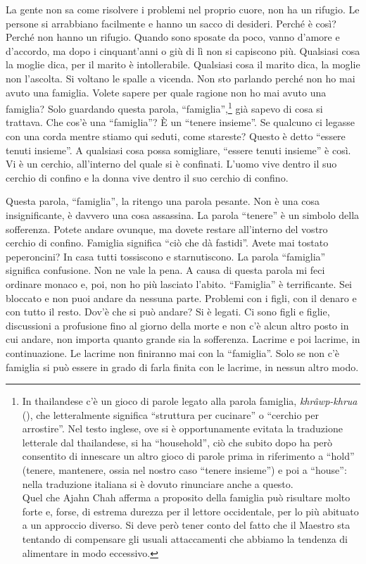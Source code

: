 La gente non sa come risolvere i problemi nel proprio cuore, non ha un
rifugio. Le persone si arrabbiano facilmente e hanno un sacco di
desideri. Perché è così? Perché non hanno un rifugio. Quando sono
sposate da poco, vanno d'amore e d'accordo, ma dopo i cinquant'anni o
giù di lì non si capiscono più. Qualsiasi cosa la moglie dica, per il
marito è intollerabile. Qualsiasi cosa il marito dica, la moglie non
l'ascolta. Si voltano le spalle a vicenda. Non sto parlando perché non
ho mai avuto una famiglia. Volete sapere per quale ragione non ho mai
avuto una famiglia? Solo guardando questa parola,
``famiglia'',\footnote{In thailandese c'è un gioco di parole legato alla
  parola famiglia, \emph{khrâwp-khrua} (), che letteralmente
  significa ``struttura per cucinare'' o ``cerchio per arrostire''. Nel
  testo inglese, ove si è opportunamente evitata la traduzione letterale
  dal thailandese, si ha ``household'', ciò che subito dopo ha però
  consentito di innescare un altro gioco di parole prima in riferimento
  a ``hold'' (tenere, mantenere, ossia nel nostro caso ``tenere
  insieme'') e poi a ``house'': nella traduzione italiana si è dovuto
  rinunciare anche a questo.\\[8pt]
  Quel che Ajahn Chah afferma a proposito della famiglia può risultare
  molto forte e, forse, di estrema durezza per il lettore occidentale,
  per lo più abituato a un approccio diverso. Si deve però tener conto
  del fatto che il Maestro sta tentando di compensare gli usuali
  attaccamenti che abbiamo la tendenza di alimentare in modo eccessivo.}
già sapevo di cosa si trattava. Che cos'è una ``famiglia''? È un
``tenere insieme''. Se qualcuno ci legasse con una corda mentre stiamo
qui seduti, come stareste? Questo è detto ``essere tenuti insieme''. A
qualsiasi cosa possa somigliare, ``essere tenuti insieme'' è così. Vi è
un cerchio, all'interno del quale si è confinati. L'uomo vive dentro il
suo cerchio di confino e la donna vive dentro il suo cerchio di confino.

Questa parola, ``famiglia'', la ritengo una parola pesante. Non è una
cosa insignificante, è davvero una cosa assassina. La parola ``tenere''
è un simbolo della sofferenza. Potete andare ovunque, ma dovete restare
all'interno del vostro cerchio di confino. Famiglia significa ``ciò che
dà fastidi''. Avete mai tostato peperoncini? In casa tutti tossiscono e
starnutiscono. La parola ``famiglia'' significa confusione. Non ne vale
la pena. A causa di questa parola mi feci ordinare monaco e, poi, non ho
più lasciato l'abito. ``Famiglia'' è terrificante. Sei bloccato e non
puoi andare da nessuna parte. Problemi con i figli, con il denaro e con
tutto il resto. Dov'è che si può andare? Si è legati. Ci sono figli e
figlie, discussioni a profusione fino al giorno della morte e non c'è
alcun altro posto in cui andare, non importa quanto grande sia la
sofferenza. Lacrime e poi lacrime, in continuazione. Le lacrime non
finiranno mai con la ``famiglia''. Solo se non c'è famiglia si può
essere in grado di farla finita con le lacrime, in nessun altro modo.

